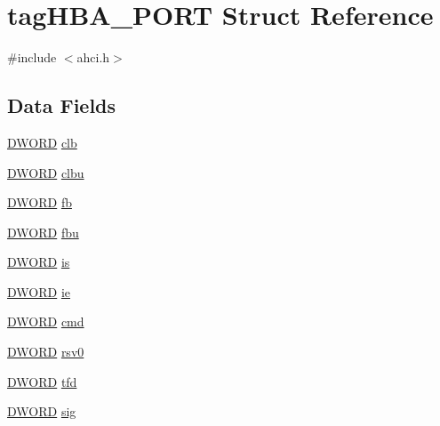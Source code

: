 \hypertarget{structtagHBA__PORT}{}\section{tag\+H\+B\+A\+\_\+\+P\+O\+RT Struct Reference}
\label{structtagHBA__PORT}


{\ttfamily \#include $<$ahci.\+h$>$}

\subsection*{Data Fields}
\begin{DoxyCompactItemize}
\item 
\hyperlink{ahci_8h_af483253b2143078cede883fc3c111ad2}{D\+W\+O\+RD} \hyperlink{structtagHBA__PORT_a780c8e115f777212d1c07e40635688bd}{clb}
\item 
\hyperlink{ahci_8h_af483253b2143078cede883fc3c111ad2}{D\+W\+O\+RD} \hyperlink{structtagHBA__PORT_a1035c66916eb3226c0fb5c81162a37b3}{clbu}
\item 
\hyperlink{ahci_8h_af483253b2143078cede883fc3c111ad2}{D\+W\+O\+RD} \hyperlink{structtagHBA__PORT_a79e614d89d9277d1da8c1746fecdd0ca}{fb}
\item 
\hyperlink{ahci_8h_af483253b2143078cede883fc3c111ad2}{D\+W\+O\+RD} \hyperlink{structtagHBA__PORT_accb4b0268c93dbd575a4927c528114a2}{fbu}
\item 
\hyperlink{ahci_8h_af483253b2143078cede883fc3c111ad2}{D\+W\+O\+RD} \hyperlink{structtagHBA__PORT_a8580d4658e46190fc8db40a6b298bde7}{is}
\item 
\hyperlink{ahci_8h_af483253b2143078cede883fc3c111ad2}{D\+W\+O\+RD} \hyperlink{structtagHBA__PORT_a6a5c3ee42874ffed476d7ba542b7b84d}{ie}
\item 
\hyperlink{ahci_8h_af483253b2143078cede883fc3c111ad2}{D\+W\+O\+RD} \hyperlink{structtagHBA__PORT_a95c7a739718780e85a8c7c40fdf14d3b}{cmd}
\item 
\hyperlink{ahci_8h_af483253b2143078cede883fc3c111ad2}{D\+W\+O\+RD} \hyperlink{structtagHBA__PORT_a93acfc284634754a95549854ede8c63c}{rsv0}
\item 
\hyperlink{ahci_8h_af483253b2143078cede883fc3c111ad2}{D\+W\+O\+RD} \hyperlink{structtagHBA__PORT_aa37d7e6ddbbcf7bf9122a6749f90bda9}{tfd}
\item 
\hyperlink{ahci_8h_af483253b2143078cede883fc3c111ad2}{D\+W\+O\+RD} \hyperlink{structtagHBA__PORT_a8da0417fcedbffa65a307f3d11c4f536}{sig}
\item 

\end{DoxyCompactItemize}
